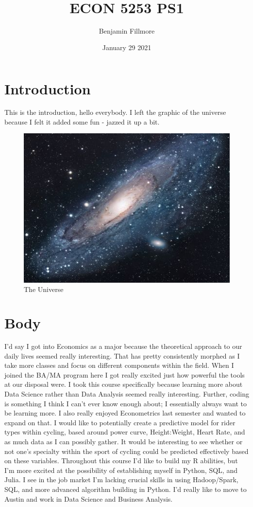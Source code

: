 \documentclass{article}
\title{ECON 5253 PS1}
\author{Benjamin Fillmore}
\date{January 29 2021}
\begin{document}
\maketitle

\section{Introduction}
This is the introduction, hello everybody. I left the graphic of the universe because I felt it added some fun - jazzed it up a bit.

\begin{figure}[h!]
\centering
\includegraphics[scale=1.7]{universe}
\caption{The Universe}
\label{fig:universe}
\end{figure}

\section{Body}
I'd say I got into Economics as a major because the theoretical approach to our daily lives seemed really interesting. That has pretty consistently morphed as I take more classes and focus on different components within the field. When I joined the BA/MA program here I got really excited just how powerful the tools at our disposal were. I took this course specifically because learning more about Data Science rather than Data Analysis seemed really interesting. Further, coding is something I think I can't ever know enough about; I essentially always want to be learning more. I also really enjoyed Econometrics last semester and wanted to expand on that. I would like to potentially create a predictive model for rider types within cycling, based around power curve, Height:Weight, Heart Rate, and as much data as I can possibly gather. It would be interesting to see whether or not one's specialty within the sport of cycling could be predicted effectively based on these variables. Throughout this course I'd like to build my R abilities, but I'm more excited at the possibility of establishing myself in Python, SQL, and Julia. I see in the job market I'm lacking crucial skills in using Hadoop/Spark, SQL, and more advanced algorithm building in Python. I'd really like to move to Austin and work in Data Science and Business Analysis. 
\end{document}
